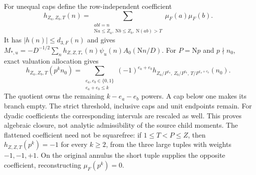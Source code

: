 \documentclass[11pt]{article}
\theoremstyle{definition}
\newcommand{\N}{\mathrm N}
\begin{document}
For unequal caps define the row-independent coefficient
\begin{equation}\label{bil-flat-coefficient}
 h_{Z_a,Z_b,T}(n)=
 \sum_{\substack{abl=n\\\N a\le Z_a,\ \N b\le Z_b,\ \N(ab)>T}}
                              \mu_F(a)\mu_F(b).
\end{equation}
It has $|h(n)|\le d_{3,F}(n)$ and gives
$M_{*,u}=-D^{-1/2}\sum_n h_{Z,Z,T_*}(n)\psi_u(n)A_0(\N n/D)$.
For $P=\N p$ and $p\nmid n_0$, exact valuation allocation gives
\begin{equation}\label{bil-prime-closure}
 h_{Z_a,Z_b,T}(p^kn_0)=
 \sum_{\substack{e_a,e_b\in\{0,1\}\\e_a+e_b\le k}}
 (-1)^{e_a+e_b}
 h_{Z_a/P^{e_a},\,Z_b/P^{e_b},\,T/P^{e_a+e_b}}(n_0).
\end{equation}
The quotient owns the remaining $k-e_a-e_b$ powers. A cap below one
makes its branch empty. The strict threshold, inclusive caps and unit
endpoints remain. For dyadic coefficients the corresponding intervals
are rescaled as well. This proves algebraic closure, not analytic
admissibility of the source child moments.
The flattened coefficient need not be squarefree: if $1\le T<P\le Z$, then
$h_{Z,Z,T}(p^k)=-1$ for every $k\ge2$, from the three large tuples with
weights $-1,-1,+1$. On the original annulus the short tuple supplies the
opposite coefficient, reconstructing $\mu_F(p^k)=0$.
\end{document}
